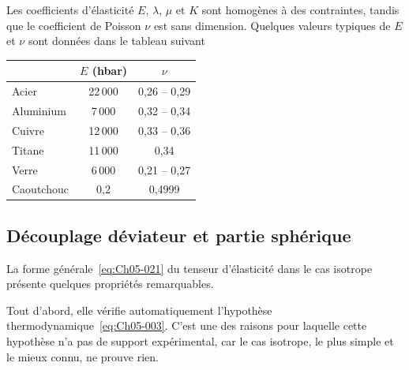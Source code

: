 Les coefficients d'élasticité $E$, $\lambda$, $\mu$ et $K$ sont homogènes à des contraintes, tandis que le coefficient de Poisson $\nu$ est sans dimension.
Quelques valeurs typiques de $E$ et $\nu$  sont données dans le tableau suivant
\begin{center}
    \begin{tabular}[h]{lcc}\hline
        & $E$ (hbar) & $\nu$ \\\hline
        Acier & 22\,000 & 0,26 -- 0,29 \\
        Aluminium & \hphantom{2}7\,000 & 0,32 -- 0,34 \\
        Cuivre & 12\,000 & 0,33 -- 0,36 \\
        Titane & 11\,000 & 0,34 \\
        Verre & \hphantom{2}6\,000 & 0,21 -- 0,27 \\
        Caoutchouc & 0,2 & 0,4999\\\hline
    \end{tabular}
\end{center}
 
\subsection{Découplage déviateur et partie sphérique} \label{ssec:Ch05-2.2}
La forme générale~\eqref{eq:Ch05-021} du tenseur d'élasticité dans le cas isotrope présente quelques propriétés remarquables. 

Tout d'abord, elle vérifie automatiquement l'hypothèse thermodynamique~\eqref{eq:Ch05-003}.
C'est une des raisons pour laquelle cette hypothèse n'a pas de support expérimental, car le cas isotrope, le plus simple et le mieux connu, ne prouve rien. 

